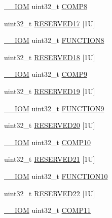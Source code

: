 \begin{DoxyCompactItemize}
\hyperlink{core__sc300_8h_ab6caba5853a60a17e8e04499b52bf691}{\+\_\+\+\_\+\+I\+OM} uint32\+\_\+t \hyperlink{struct_d_w_t___type_aee138bc70746585e4ccf62557954c07f}{C\+O\+M\+P8}
\item 
uint32\+\_\+t \hyperlink{struct_d_w_t___type_a04c216ba5dbecb136097f61e5fa612b9}{R\+E\+S\+E\+R\+V\+E\+D17} \mbox{[}1\+U\mbox{]}
\item 
\hyperlink{core__sc300_8h_ab6caba5853a60a17e8e04499b52bf691}{\+\_\+\+\_\+\+I\+OM} uint32\+\_\+t \hyperlink{struct_d_w_t___type_acdd6b87ea4bc95345687074c53098e75}{F\+U\+N\+C\+T\+I\+O\+N8}
\item 
uint32\+\_\+t \hyperlink{struct_d_w_t___type_ae16bddaf7ec543d72128a788c1405b4f}{R\+E\+S\+E\+R\+V\+E\+D18} \mbox{[}1\+U\mbox{]}
\item 
\hyperlink{core__sc300_8h_ab6caba5853a60a17e8e04499b52bf691}{\+\_\+\+\_\+\+I\+OM} uint32\+\_\+t \hyperlink{struct_d_w_t___type_abf79b853fc2d25de9c03bdb183e4aee0}{C\+O\+M\+P9}
\item 
uint32\+\_\+t \hyperlink{struct_d_w_t___type_a0a6b643a661528e364e3825fff2306fe}{R\+E\+S\+E\+R\+V\+E\+D19} \mbox{[}1\+U\mbox{]}
\item 
\hyperlink{core__sc300_8h_ab6caba5853a60a17e8e04499b52bf691}{\+\_\+\+\_\+\+I\+OM} uint32\+\_\+t \hyperlink{struct_d_w_t___type_a379b5b8f7d40003b7bdabd535e0378a1}{F\+U\+N\+C\+T\+I\+O\+N9}
\item 
uint32\+\_\+t \hyperlink{struct_d_w_t___type_a02405d82b0e7f6e27f3f7fac22ca7508}{R\+E\+S\+E\+R\+V\+E\+D20} \mbox{[}1\+U\mbox{]}
\item 
\hyperlink{core__sc300_8h_ab6caba5853a60a17e8e04499b52bf691}{\+\_\+\+\_\+\+I\+OM} uint32\+\_\+t \hyperlink{struct_d_w_t___type_acf26842434e5cd1487a49812ec842d03}{C\+O\+M\+P10}
\item 
uint32\+\_\+t \hyperlink{struct_d_w_t___type_ae6ba892bac69bcf19cb3d998c63e2877}{R\+E\+S\+E\+R\+V\+E\+D21} \mbox{[}1\+U\mbox{]}
\item 
\hyperlink{core__sc300_8h_ab6caba5853a60a17e8e04499b52bf691}{\+\_\+\+\_\+\+I\+OM} uint32\+\_\+t \hyperlink{struct_d_w_t___type_a63c72c28fd46b22230894366a8d9cdda}{F\+U\+N\+C\+T\+I\+O\+N10}
\item 
uint32\+\_\+t \hyperlink{struct_d_w_t___type_ab4eff17a1119c7ee5cab7e0326fd4339}{R\+E\+S\+E\+R\+V\+E\+D22} \mbox{[}1\+U\mbox{]}
\item 
\hyperlink{core__sc300_8h_ab6caba5853a60a17e8e04499b52bf691}{\+\_\+\+\_\+\+I\+OM} uint32\+\_\+t \hyperlink{struct_d_w_t___type_aa199b91c854edd21ded38b8922d1e2a7}{C\+O\+M\+P11}
\item 

\end{DoxyCompactItemize}
